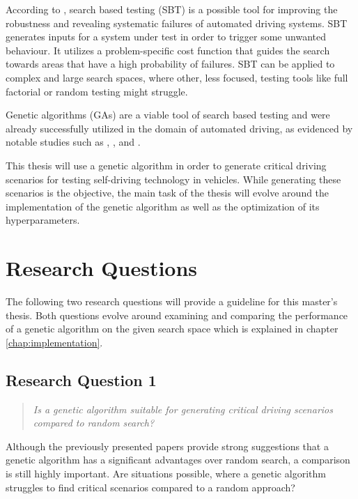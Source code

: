 According to \cite{kluck_search-based_2022}, search based testing (SBT) is a possible tool for improving the robustness and revealing systematic failures of automated driving systems. SBT generates inputs for a system under test in order to trigger some unwanted behaviour. It utilizes a problem-specific cost function that guides the search towards areas that have a high probability of failures. SBT can be applied to complex and large search spaces, where other, less focused, testing tools like full factorial or random testing might struggle.

Genetic algorithms (GAs) are a viable tool of search based testing and were already successfully utilized in the domain of automated driving, as evidenced by notable studies such as \cite{klampfl_using_nodate}, \cite{felbinger_comparing_2019}, \cite{kaufmann_critical_2021} and \cite{almanee_scenorita_2021}. 

This thesis will use a genetic algorithm in order to generate critical driving scenarios for testing self-driving technology in vehicles. While generating these scenarios is the objective, the main task of the thesis will evolve around the implementation of the genetic algorithm as well as the optimization of its hyperparameters.

\section{Research Questions}
The following two research questions will provide a guideline for this master's thesis. Both questions evolve around examining and comparing the performance of a genetic algorithm on the given search space which is explained in chapter \ref{chap:implementation}.

\subsection{Research Question 1}
\begin{quote}
	\begin{em}
		\textit{Is a genetic algorithm suitable for generating critical driving scenarios compared to random search?}
	\end{em}
\end{quote}

Although the previously presented papers provide strong suggestions that a genetic algorithm has a significant advantages over random search, a comparison is still highly important. Are situations possible, where a genetic algorithm struggles to find critical scenarios compared to a random approach?


